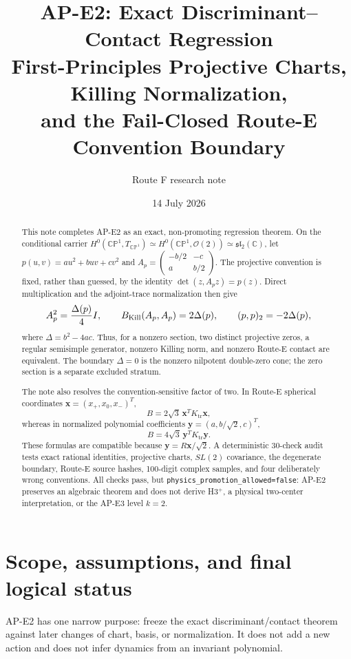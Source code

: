 \documentclass[11pt]{article}
\title{AP-E2: Exact Discriminant--Contact Regression\\
First-Principles Projective Charts, Killing Normalization,\\
and the Fail-Closed Route-E Convention Boundary}
\author{Route F research note}
\date{14 July 2026}
\numberwithin{equation}{section}
\newcommand{\CP}{\mathbb{CP}}
\newcommand{\cO}{\mathcal O}
\newcommand{\sltwo}{\mathfrak{sl}_2(\mathbb C)}
\newcommand{\Ktr}{K_{\mathrm{tr}}}
\newcommand{\nopromote}{\texttt{physics\_promotion\_allowed=false}}
\begin{document}
\maketitle

\begin{abstract}
This note completes AP-E2 as an exact, non-promoting regression theorem.  On
the conditional carrier
\(H^0(\CP^1,T_{\CP^1})\simeq H^0(\CP^1,\cO(2))\simeq\sltwo\), let
\(p(u,v)=au^2+buv+cv^2\) and
\(
 A_p=\left(\begin{smallmatrix}-b/2&-c\\a&b/2\end{smallmatrix}\right)
\).
The projective convention is fixed, rather than guessed, by the identity
\(\det(z,A_pz)=p(z)\).  Direct multiplication and the adjoint-trace
normalization then give
\[
 A_p^2=\frac{\Delta(p)}4I,
 \qquad B_{\rm Kill}(A_p,A_p)=2\Delta(p),
 \qquad (p,p)_2=-2\Delta(p),
 \]
where \(\Delta=b^2-4ac\).  Thus, for a nonzero section, two distinct
projective zeros, a regular semisimple generator, nonzero Killing norm, and
nonzero Route-E contact are equivalent.  The boundary \(\Delta=0\) is the
nonzero nilpotent double-zero cone; the zero section is a separate excluded
stratum.

The note also resolves the convention-sensitive factor of two.  In Route-E
spherical coordinates \(\bm x=(x_+,x_0,x_-)^T\),
\[
 B=2\sqrt3\,\bm x^T\Ktr\bm x,
 \]
whereas in normalized polynomial coefficients
\(\bm y=(a,b/\sqrt2,c)^T\),
\[
 B=4\sqrt3\,\bm y^T\Ktr\bm y.
\]
These formulas are compatible because \(\bm y=R\bm x/\sqrt2\).  A
deterministic 30-check audit tests exact rational identities, projective
charts, \(SL(2)\) covariance, the degenerate boundary, Route-E source hashes,
100-digit complex samples, and four deliberately wrong conventions.  All
checks pass, but \nopromote: AP-E2 preserves an
algebraic theorem and does not derive H3$^+$, a physical two-center
interpretation, or the AP-E3 level \(k=2\).
\end{abstract}

\tableofcontents

\section{Scope, assumptions, and final logical status}

AP-E2 has one narrow purpose: freeze the exact discriminant/contact theorem
against later changes of chart, basis, or normalization.  It does not add a
new action and does not infer dynamics from an invariant polynomial.
\end{document}
